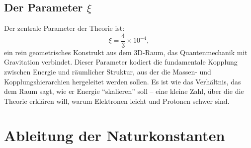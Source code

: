 	\subsection{Der Parameter $\xi$}
	Der zentrale Parameter der Theorie ist:
	\[
	\xi = \frac{4}{3} \times 10^{-4},
	\]
	ein rein geometrisches Konstrukt aus dem 3D-Raum, das Quantenmechanik mit Gravitation verbindet. Dieser Parameter kodiert die fundamentale Kopplung zwischen Energie und räumlicher Struktur, aus der die Massen- und Kopplungshierarchien hergeleitet werden sollen. Es ist wie das Verhältnis, das dem Raum sagt, wie er Energie ``skalieren'' soll – eine kleine Zahl, über die die Theorie erklären will, warum Elektronen leicht und Protonen schwer sind.
	
	\section{Ableitung der Naturkonstanten}
